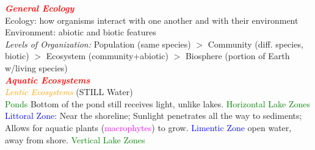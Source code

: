 \documentclass{article}
\author{SBHS Science Olympiad, Tarang}
\newcommand{\red}[1]{\textcolor{red}{#1}}
\newcommand{\green}[1]{\textcolor{green}{#1}}
\newcommand{\blue}[1]{\textcolor{blue}{#1}}
\newcommand{\pink}[1]{\textcolor{magenta}{#1}}
\newcommand{\orange}[1]{\textcolor{orange}{#1}}
\newcommand{\mysection}[1]{\textbf{\textit{\red{#1}}}}
\newcommand{\mysubsection}[1]{{\textit{\orange{#1}}}}
\newcommand{\mysubsub}[1]{{{\green{#1}}}}
\newcommand{\mysubsubsub}[1]{{{\blue{#1}}}}
\newcommand{\vocab}[1]{{\pink{#1}}}
\begin{document}
	\begin{multicols*}{4}
		
		\noindent
		
		\mysection{General Ecology} \\
		Ecology: how organisms interact with one another and with their environment \\
		Environment: abiotic and biotic features\\
		\textit{Levels of Organization:} Population (same species) $>$  Community (diff. species, biotic) $>$ Ecosystem (community+abiotic) $>$ Biosphere (portion of Earth w/living species)
		\\
		\mysection{Aquatic Ecosystems} \\
		\mysubsection{Lentic Ecosystems} (STILL Water) \\
		\mysubsub{Ponds} Bottom of the pond still receives light, unlike lakes.
		\mysubsub{Horizontal Lake Zones}
		\mysubsubsub{Littoral Zone}: Near the shoreline; Sunlight penetrates all the way to sediments; Allows for aquatic plants (\vocab{macrophytes}) to grow.
		\mysubsubsub{Limentic Zone} open water, away from shore.
		\mysubsub{Vertical Lake Zones}
		
		
	\end{multicols*}
\end{document}

